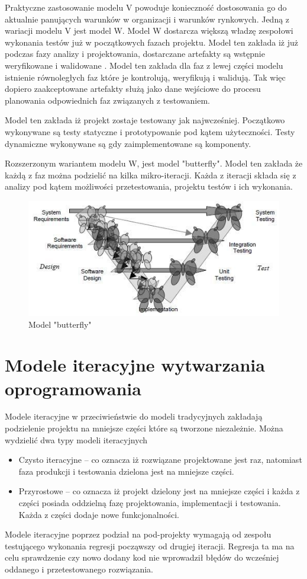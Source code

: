 Praktyczne zastosowanie modelu V powoduje konieczność dostosowania go do aktualnie panujących warunków w organizacji i warunków rynkowych. Jedną z wariacji modelu V jest model W. Model W dostarcza większą władzę zespołowi wykonania testów już w początkowych fazach projektu. Model ten zakłada iż już podczas fazy analizy i projektowania, dostarczane artefakty są wstępnie weryfikowane i walidowane \cite{wmodel}. Model ten zakłada dla faz z lewej części modelu istnienie równoległych faz które je kontrolują, weryfikują i walidują. Tak więc dopiero zaakceptowane artefakty służą jako dane wejściowe do procesu planowania odpowiednich faz związanych z testowaniem.

Model ten zakłada iż projekt zostaje testowany jak najwcześniej. Początkowo wykonywane są testy statyczne i prototypowanie pod kątem użyteczności. Testy dynamiczne wykonywane są gdy zaimplementowane są komponenty.


Rozszerzonym wariantem modelu W, jest model "butterfly"\cite{BUTTERFLY}. Model ten zakłada że każdą z faz można podzielić na kilka mikro-iteracji. Każda z iteracji składa się z analizy pod kątem możliwości przetestowania, projektu testów i ich wykonania. 
\begin{figure}[h]
\centerline{\includegraphics[scale=0.5]{img/butterflymodel2.JPG}}
\caption{Model "butterfly" \cite{BUTTERFLY}} 
\label{fig:vmodel}
\end{figure}
\section{Modele iteracyjne wytwarzania oprogramowania}
Modele iteracyjne w przeciwieństwie do modeli tradycyjnych zakładają podzielenie projektu na mniejsze części które są tworzone niezależnie. Można wydzielić dwa typy modeli iteracyjnych
\begin{itemize}
  \item Czysto iteracyjne -- co oznacza iż rozwiązane projektowane jest raz, natomiast faza produkcji i testowania dzielona jest na mniejsze części.
  \item Przyrostowe -- co oznacza iż projekt dzielony jest na mniejsze części i każda z części posiada oddzielną fazę projektowania, implementacji i testowania. Każda z części dodaje nowe funkcjonalności.
 
\end{itemize}
 Modele iteracyjne poprzez podział na pod-projekty wymagają od zespołu testującego wykonania regresji począwszy od drugiej iteracji. Regresja ta ma na celu sprawdzenie czy nowo dodany kod nie wprowadził błędów do wcześniej oddanego i przetestowanego rozwiązania.
